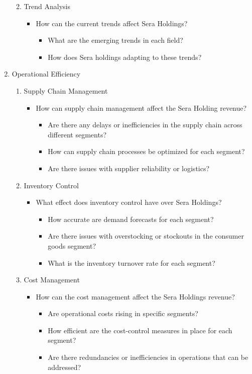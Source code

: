\documentclass[12pt,a4Paper]{article}
\begin{document}
\begin{enumerate}
\begin{enumerate}
\begin{itemize}
		\end{itemize}
	\item Trend Analysis
		\begin{itemize}
		\item How can the current trends affect Sera Holdings?
			\begin{itemize}
			\item What are the emerging trends in each field?
			\item How does Sera holdings adapting to these trends?
			\end{itemize}
		\end{itemize}
	\end{enumerate}
\item Operational Efficiency
	\begin{enumerate}
	\item Supply Chain Management
		\begin{itemize}
		\item How can supply chain management affect the Sera Holding revenue?
			\begin{itemize}
			\item Are there any delays or inefficiencies in the supply chain across different segments?
			\item How can supply chain processes be optimized for each segment?
			\item Are there issues with supplier reliability or logistics?
			\end{itemize}
		\end{itemize}
	\item Inventory Control
		\begin{itemize}
		\item What effect does inventory control have over Sera Holdings?
			\begin{itemize}
			\item How accurate are demand forecasts for each segment?
			\item Are there issues with overstocking or stockouts in the consumer goods segment?
			\item What is the inventory turnover rate for each segment?
			\end{itemize}
		\end{itemize}
	\item Cost Management
		\begin{itemize}
		\item How can the cost management affect the Sera Holdings revenue?
			\begin{itemize}
			\item Are operational costs rising in specific segments?
			\item How efficient are the cost-control measures in place for each segment?
			\item Are there redundancies or inefficiencies in operations that can be addressed?
			\end{itemize}
		\end{itemize}
	\end{enumerate}
\end{enumerate}
\end{document}
